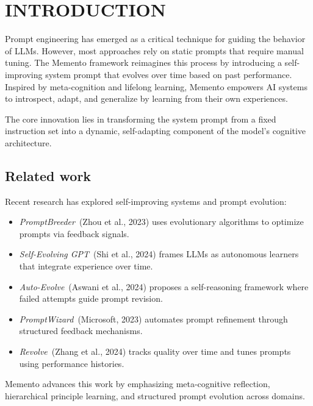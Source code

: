\documentclass[10pt,a4paper,twocolumn]{article}
\begin{document}
\linebreak
\linebreak



\section{INTRODUCTION}

Prompt engineering has emerged as a critical technique for guiding the behavior of LLMs. However, most approaches rely on static prompts that require manual tuning. The Memento framework reimagines this process by introducing a self-improving system prompt that evolves over time based on past performance. Inspired by meta-cognition and lifelong learning, Memento empowers AI systems to introspect, adapt, and generalize by learning from their own experiences.

The core innovation lies in transforming the system prompt from a fixed instruction set into a dynamic, self-adapting component of the model’s cognitive architecture.



\subsection{Related work}

Recent research has explored self-improving systems and prompt evolution:

\begin{itemize}
    \item \textit{PromptBreeder} (Zhou et al., 2023) uses evolutionary algorithms to optimize prompts via feedback signals.
    \item \textit{Self-Evolving GPT} (Shi et al., 2024) frames LLMs as autonomous learners that integrate experience over time.
    \item \textit{Auto-Evolve} (Aswani et al., 2024) proposes a self-reasoning framework where failed attempts guide prompt revision.
    \item \textit{PromptWizard} (Microsoft, 2023) automates prompt refinement through structured feedback mechanisms.
    \item \textit{Revolve} (Zhang et al., 2024) tracks quality over time and tunes prompts using performance histories.
\end{itemize}
Memento advances this work by emphasizing meta-cognitive reflection, hierarchical principle learning, and structured prompt evolution across domains.
\end{document}
